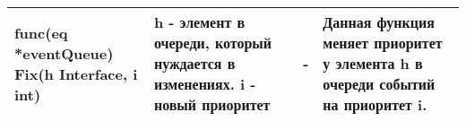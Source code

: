 \begin{table}[]
\begin{tabularx}{\textwidth}{|X|X|X|X|}
func(eq *eventQueue) Fix(h Interface, i int) & h - элемент в очереди, который нуждается в изменениях. i - новый приоритет & -                                               & Данная функция меняет приоритет у элемента h в очереди событий на приоритет i.                                                                                                                                           \\ \hline
\end{tabularx}
\end{table}



